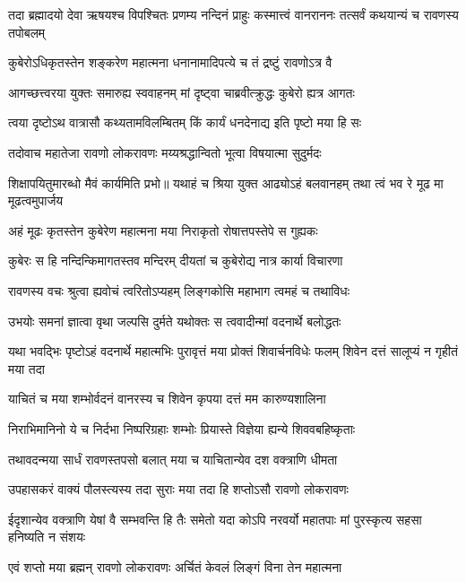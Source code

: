 \threelineshloka
{तदा ब्रह्मादयो देवा ऋषयश्च विपश्चितः}
{प्रणम्य नन्दिनं प्राहुः कस्मात्त्वं वानराननः}
{तत्सर्वं कथयान्यं च रावणस्य तपोबलम्}%


\twolineshloka
{कुबेरोऽधिकृतस्तेन शङ्करेण महात्मना}
{धनानामादिपत्ये च तं द्रष्टुं रावणोऽत्र वै}%

\twolineshloka
{आगच्छत्त्वरया युक्तः समारुह्य स्ववाहनम्}
{मां दृष्ट्वा चाब्रवीत्क्रुद्धः कुबेरो ह्यत्र आगतः}%

\twolineshloka
{त्वया दृष्टोऽथ वात्रासौ कथ्यतामविलम्बितम्}
{किं कार्यं धनदेनाद्य इति पृष्टो मया हि सः}%

\twolineshloka
{तदोवाच महातेजा रावणो लोकरावणः}
{मय्यश्रद्धान्वितो भूत्वा विषयात्मा सुदुर्मदः}%

\threelineshloka
{शिक्षापयितुमारब्धो मैवं कार्यमिति प्रभो॥}
{यथाहं च श्रिया युक्त आढ्योऽहं बलवानहम्}
{तथा त्वं भव रे मूढ मा मूढत्वमुपार्जय}%

\twolineshloka
{अहं मूढः कृतस्तेन कुबेरेण महात्मना}
{मया निराकृतो रोषात्तपस्तेपे स गुह्यकः}%

\twolineshloka
{कुबेरः स हि नन्दिन्किमागतस्तव मन्दिरम्}
{दीयतां च कुबेरोद्य नात्र कार्या विचारणा}%

\twolineshloka
{रावणस्य वचः श्रुत्वा ह्यवोचं त्वरितोऽप्यहम्}
{लिङ्गकोसि महाभाग त्वमहं च तथाविधः}%

\twolineshloka
{उभयोः समनां ज्ञात्वा वृथा जल्पसि दुर्मते}
{यथोक्तः स त्ववादीन्मां वदनार्थे बलोद्धतः}%

\threelineshloka
{यथा भवद्भिः पृष्टोऽहं वदनार्थे महात्मभिः}
{पुरावृत्तं मया प्रोक्तं शिवार्चनविधेः फलम्}
{शिवेन दत्तं सालूप्यं न गृहीतं मया तदा}%

\twolineshloka
{याचितं च मया शम्भोर्वदनं वानरस्य च}
{शिवेन कृपया दत्तं मम कारुण्यशालिना}%

\twolineshloka
{निराभिमानिनो ये च निर्दभा निष्परिग्रहाः}
{शम्भोः प्रियास्ते विज्ञेया ह्यन्ये शिववबहिष्कृताः}%

\twolineshloka
{तथावदन्मया सार्धं रावणस्तपसो बलात्}
{मया च याचितान्येव दश वक्त्राणि धीमता}%

\twolineshloka
{उपहासकरं वाक्यं पौलस्त्यस्य तदा सुराः}
{मया तदा हि शप्तोऽसौ रावणो लोकरावणः}%

\threelineshloka
{ईदृशान्येव वक्त्राणि येषां वै सम्भवन्ति हि}
{तैः समेतो यदा कोऽपि नरवर्यो महातपाः}
{मां पुरस्कृत्य सहसा हनिष्यति न संशयः}%

\twolineshloka
{एवं शप्तो मया ब्रह्मन् रावणो लोकरावणः}
{अर्चितं केवलं लिङ्गं विना तेन महात्मना}%

